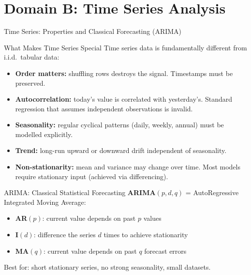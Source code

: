 \documentclass[aspectratio=169,10pt]{beamer}
\begin{document}
\section{Domain B: Time Series Analysis}

\begin{frame}{Time Series: Properties and Classical Forecasting (ARIMA)}
 
      \begin{block}{What Makes Time Series Special}
        \footnotesize
        Time series data is fundamentally different from i.i.d.\ tabular data:
        \begin{itemize}
          \item \textbf{Order matters:} shuffling rows destroys the signal.  Timestamps must be preserved.
          \item \textbf{Autocorrelation:} today's value is correlated with yesterday's.  Standard regression that assumes independent observations is invalid.
          \item \textbf{Seasonality:} regular cyclical patterns (daily, weekly, annual) must be modelled explicitly.
          \item \textbf{Trend:} long-run upward or downward drift independent of seasonality.
          \item \textbf{Non-stationarity:} mean and variance may change over time.  Most models require stationary input (achieved via differencing).
        \end{itemize}
      \end{block}
    
      \begin{block}{ARIMA: Classical Statistical Forecasting}
        \footnotesize \textbf{ARIMA}$(p,d,q)$ = AutoRegressive Integrated Moving Average:
        \begin{itemize}
          \item \textbf{AR}$(p)$: current value depends on past $p$ values
          \item \textbf{I}$(d)$: difference the series $d$ times to achieve stationarity
          \item \textbf{MA}$(q)$: current value depends on past $q$ forecast errors
        \end{itemize}
        Best for: short stationary series, no strong seasonality, small datasets.
      \end{block}
 
\end{frame}
\end{document}
